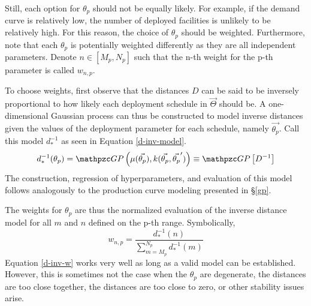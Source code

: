 Still, each option for $\theta_p$ should not be equally likely. 
For example, if the demand curve is relatively low, the number of deployed 
facilities is unlikely to be relatively high. For this reason, the choice 
of $\theta_p$ should be weighted.  Furthermore, note that each $\theta_p$
is potentially weighted differently as they are all independent parameters.
Denote $n \in [M_p, N_p]$ such that the n-th weight for the p-th parameter 
is called $w_{n,p}$. 

To choose weights, first observe that the distances $D$ can be said to be
inversely proportional to how likely each deployment schedule in 
$\vec{\Theta}$ should be. A one-dimensional Gaussian process can thus be
constructed to model inverse distances given the values of the deployment 
parameter for each schedule, namely $\vec{\theta_p}$.  Call this model 
$d_*^{-1}$ as seen in Equation \ref{d-inv-model}.
\begin{equation}
\label{d-inv-model}
d_*^{-1}(\theta_p) = \GP\left(\mu(\vec{\theta_p}), 
                              k(\vec{\theta_p}, \vec{\theta_p}^\prime)\right)
                   \equiv \GP\left[D^{-1}\right]
\end{equation}
The construction, regression of hyperparameters, and evaluation of this 
model follows analogously to the production curve modeling presented in 
\S\ref{gp}.

The weights for $\theta_p$ are thus the normalized evaluation of the 
inverse distance model for all $m$ and $n$ defined on the p-th range.
Symbolically, 
\begin{equation}
\label{d-inv-w}
w_{n,p} = \frac{d_*^{-1}(n)}{\sum_{m=M_p}^{N_p} d_*^{-1}(m)}
\end{equation}
Equation \ref{d-inv-w} works very well as long as a valid model can 
be established.  However, this is sometimes not the case when the $\theta_p$
are degenerate, the distances are too close together, the distances are 
too close to zero, or other stability issues arise.

